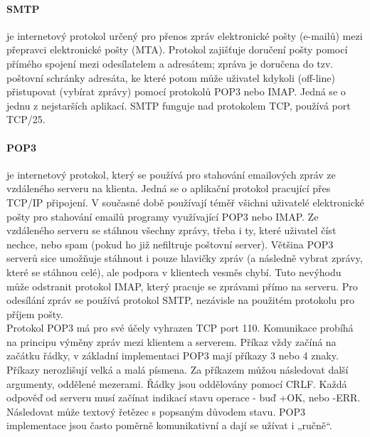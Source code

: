 \documentclass[10pt,a4paper]{article}
\begin{document}
\paragraph{SMTP} je internetový protokol určený pro přenos zpráv elektronické pošty (e-mailů) mezi přepravci elektronické pošty (MTA). Protokol zajišťuje doručení pošty pomocí přímého spojení mezi odesílatelem a adresátem; zpráva je doručena do tzv. poštovní schránky adresáta, ke které potom může uživatel kdykoli (off-line) přistupovat (vybírat zprávy) pomocí protokolů POP3 nebo IMAP. Jedná se o jednu z nejstarších aplikací. SMTP funguje nad protokolem TCP, používá port TCP/25.
\paragraph{POP3} je internetový protokol, který se používá pro stahování emailových zpráv ze vzdáleného serveru na klienta. Jedná se o aplikační protokol pracující přes TCP/IP připojení. V současné době používají téměř všichni uživatelé elektronické pošty pro stahování emailů programy využívající POP3 nebo IMAP. Ze vzdáleného serveru se stáhnou všechny zprávy, třeba i ty, které uživatel číst nechce, nebo spam (pokud ho již nefiltruje poštovní server). Většina POP3 serverů sice umožňuje stáhnout i pouze hlavičky zpráv (a následně vybrat zprávy, které se stáhnou celé), ale podpora v klientech vesměs chybí. Tuto nevýhodu může odstranit protokol IMAP, který pracuje se zprávami přímo na serveru. Pro odesílání zpráv se používá protokol SMTP, nezávisle na použitém protokolu pro příjem pošty. \\
Protokol POP3 má pro své účely vyhrazen TCP port 110. Komunikace probíhá na principu výměny zpráv mezi klientem a serverem. Příkaz vždy začíná na začátku řádky, v základní implementaci POP3 mají příkazy 3 nebo 4 znaky. Příkazy nerozlišují velká a malá písmena. Za příkazem můžou následovat další argumenty, oddělené mezerami. Řádky jsou oddělovány pomocí CRLF. Každá odpověď od serveru musí začínat indikací stavu operace - buď +OK, nebo -ERR. Následovat může textový řetězec s popsaným důvodem stavu. POP3 implementace jsou často poměrně komunikativní a dají se užívat i „ručně“.
\end{document}
